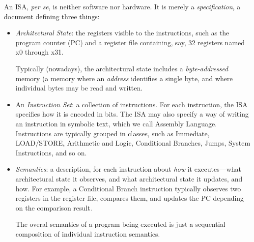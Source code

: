 An ISA, \emph{per se}, is neither software nor hardware.  It is merely
a \emph{specification}, a document defining three things:

\begin{itemize}


  \item \emph{Architectural State}: the registers visible to the
        instructions, such as the program counter (PC) and a register
        file containing, say, 32 registers named x0 through x31.

        Typically (nowadays), the architectural state includes a
        \emph{byte-addressed} memory (a memory where an \emph{address}
        identifies a single byte, and where individual bytes may be
        read and written.


  \item An \emph{Instruction Set}: a collection of instructions.  For
        each instruction, the ISA specifies how it is encoded in bits.
        The ISA may also specify a way of writing an instruction in
        symbolic text, which we call Assembly Language.  Instructions
        are typically grouped in classes, such as Immediate,
        LOAD/STORE, Arithmetic and Logic, Conditional Branches, Jumps,
        System Instructions, and so on.


  \item \emph{Semantics}: a description, for each instruction about
        \emph{how} it executes---what architectural state it observes,
        and what architectural state it updates, and how.  For
        example, a Conditional Branch instruction typically observes
        two registers in the register file, compares them, and updates
        the PC depending on the comparison result.

        The overal semantics of a program being executed is just a
        sequential composition of individual instruction semantics.

\end{itemize}


